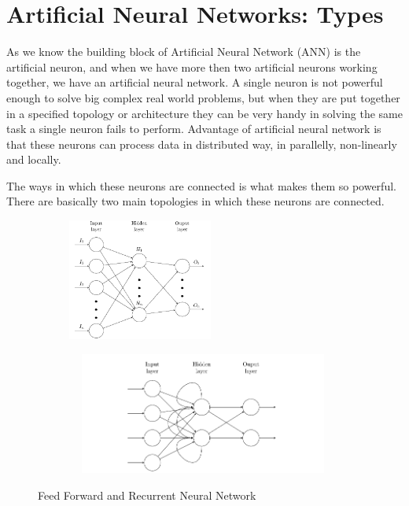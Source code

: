 \documentclass[12pt, a4paper]{report}
\begin{document}
\section{Artificial Neural Networks: Types}

As we know the building block of Artificial Neural Network (ANN) is the artificial neuron, and when we have more then two artificial neurons working together, we have an artificial neural network. A single neuron is not powerful enough to solve big complex real world problems, but when they are put together in a specified topology or architecture they can be very handy in solving the same task a single neuron fails to perform. Advantage of artificial neural network is that these neurons can process data in distributed way, in parallelly, non-linearly and locally. \\\par

The ways in which these neurons are connected is what makes them so powerful. There are basically two main topologies in which these neurons are connected. 
\begin{figure}[h]
\centering
  \begin{subfigure}[b]{0.4\textwidth}
    \includegraphics[width=\textwidth,height=4cm]{nn_2.png}
    
  \end{subfigure}
  \begin{subfigure}[b]{0.4\textwidth}
    \includegraphics[width=9cm,height=4cm]{rnn.png}
  \end{subfigure}
  \caption{Feed Forward and Recurrent Neural Network}
 \label{fig:FFRN}
\end{figure}
\end{document}
